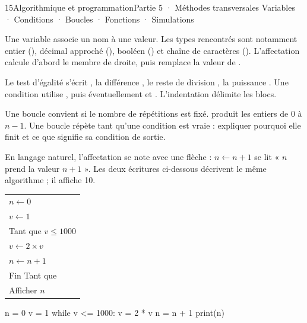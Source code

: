 \begin{ouverture}[algorithmique]{15}{Algorithmique et programmation}{Partie 5 · Méthodes transversales}
{Variables · Conditions · Boucles · Fonctions · Simulations}
\end{ouverture}
\pagestyle{otMain}\essentiel\fontsize{11}{15}\selectfont
{}
\begin{definition}Une variable associe un nom à une valeur. Les types rencontrés sont notamment entier (), décimal approché (), booléen () et chaîne de caractères (). L’affectation  calcule d’abord le membre de droite, puis remplace la valeur de .\end{definition}
\begin{propriete}Le test d’égalité s’écrit \code{==}, la différence \code{!=}, le reste de division \code{\%}, la puissance \code{**}. Une condition utilise , puis éventuellement  et . L’indentation délimite les blocs.\end{propriete}
\begin{savoirfaire}
Une boucle  convient si le nombre de répétitions est fixé.  produit les entiers de 0 à $n-1$. Une boucle  répète tant qu’une condition est vraie : expliquer pourquoi elle finit et ce que signifie sa condition de sortie.
\end{savoirfaire}
\begin{savoirfaire}
En langage naturel, l’affectation se note avec une flèche : $n\leftarrow n+1$ se lit « $n$ prend la valeur $n+1$ ». Les deux écritures ci-dessous décrivent le même algorithme ; il affiche 10.
\begin{codecote}[0.42]
\renewcommand{\arraystretch}{1.18}\begin{tabular}{@{}l@{}}
$n\leftarrow0$\\
$v\leftarrow1$\\
Tant que $v\le1000$\\
\quad $v\leftarrow2\times v$\\
\quad $n\leftarrow n+1$\\
Fin Tant que\\
Afficher $n$
\end{tabular}
\cote
\begin{pythoncol}
n = 0
v = 1
while v <= 1000:
    v = 2 * v
    n = n + 1
print(n)
\end{pythoncol}
\end{codecote}
\end{savoirfaire}
